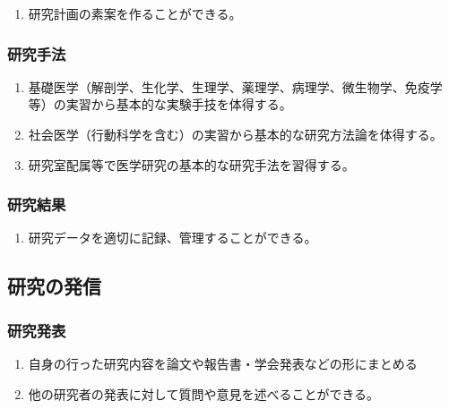 \begin{enumerate}
\def\labelenumi{\arabic{enumi}.}
\tightlist
\item
  研究計画の素案を作ることができる。
\end{enumerate}

\hypertarget{ux7814ux7a76ux624bux6cd5}{%
\subsubsection{研究手法}\label{ux7814ux7a76ux624bux6cd5}}

\begin{enumerate}
\def\labelenumi{\arabic{enumi}.}
\tightlist
\item
  基礎医学（解剖学、生化学、生理学、薬理学、病理学、微生物学、免疫学等）の実習から基本的な実験手技を体得する。
\item
  社会医学（行動科学を含む）の実習から基本的な研究方法論を体得する。
\item
  研究室配属等で医学研究の基本的な研究手法を習得する。
\end{enumerate}

\hypertarget{ux7814ux7a76ux7d50ux679c}{%
\subsubsection{研究結果}\label{ux7814ux7a76ux7d50ux679c}}

\begin{enumerate}
\def\labelenumi{\arabic{enumi}.}
\tightlist
\item
  研究データを適切に記録、管理することができる。
\end{enumerate}

\hypertarget{ux7814ux7a76ux306eux767aux4fe1}{%
\subsection{研究の発信}\label{ux7814ux7a76ux306eux767aux4fe1}}

\hypertarget{ux7814ux7a76ux767aux8868}{%
\subsubsection{研究発表}\label{ux7814ux7a76ux767aux8868}}

\begin{enumerate}
\def\labelenumi{\arabic{enumi}.}
\tightlist
\item
  自身の行った研究内容を論文や報告書・学会発表などの形にまとめる
\item
  他の研究者の発表に対して質問や意見を述べることができる。
\end{enumerate}


